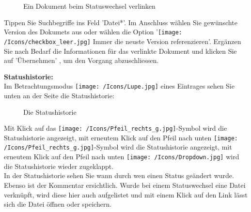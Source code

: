 \begin{figure}[H]
\caption{Ein Dokument beim Statuswechsel verlinken}
\end{figure}

Tippen Sie Suchbegriffe ins Feld 'Datei*'. Im Anschluss wählen Sie gewünschte Version des Dokumets aus oder wählen die Option '\texttt{[image: /Icons/checkbox\_leer.jpg]} Immer die neuste Version referenzieren'. Ergänzen Sie nach Bedarf die Informationen für das verlinkte Dokument und klicken Sie auf 'Übernehmen' , um den Vorgang abzuschliessen.

\vspace{\baselineskip}

\textbf{Statushistorie:}\\
Im Betrachtungsmodus \texttt{[image: /Icons/Lupe.jpg]} eines Eintrages sehen Sie unten an der Seite die Statushistorie:

\begin{figure}[H]
\caption{Die Statushistorie}
\end{figure}

Mit Klick auf das \texttt{[image: /Icons/Pfeil\_rechts\_g.jpg]}-Symbol wird die Statushistorie  angezeigt, mit erneutem Klick auf den Pfeil nach unten \texttt{[image: /Icons/Pfeil\_rechts\_g.jpg]}-Symbol wird die Statushistorie angezeigt, mit erneutem Klick auf den Pfeil nach unten \texttt{[image: /Icons/Dropdown.jpg]} wird die Statushistorie wieder zugeklappt.\\
In der Statushistorie sehen Sie wann durch wen einen Status geändert wurde. Ebenso ist der Kommentar ersichtlich. Wurde bei einem Statuswechsel eine Datei verknüpft, wird diese hier auch aufgelistet  und mit einem Klick auf den Link lässt sich die Datei öffnen oder speichern.


